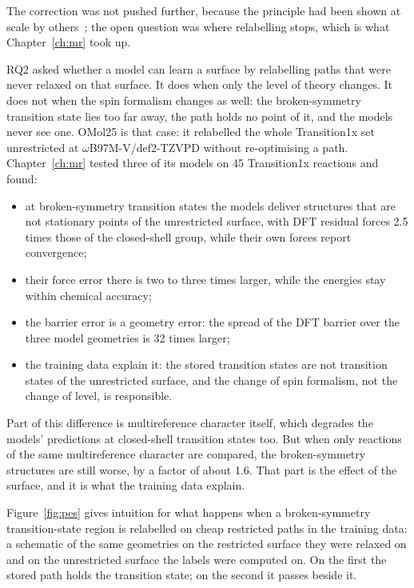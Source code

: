The correction was not pushed further, because the principle had been
shown at scale by others~\cite{allen2026, ren2026}; the open question
was where relabelling stops, which is what Chapter~\ref{ch:mr} took up.

RQ2 asked whether a model can learn a surface by relabelling paths
that were never relaxed on that surface. It does when only the level
of theory changes. It does not when the spin formalism changes as
well: the broken-symmetry transition state lies too far away, the
path holds no point of it, and the models never see one. OMol25 is
that case: it relabelled the whole Transition1x set unrestricted at
\mbox{$\omega$B97M-V/def2-TZVPD} without re-optimising a path.
Chapter~\ref{ch:mr} tested three of its models on 45 Transition1x
reactions and found:

\begin{itemize}
  \item at broken-symmetry transition states the models deliver
    structures that are not stationary points of the unrestricted
    surface, with DFT residual forces 2.5 times those of the
    closed-shell group, while their own forces report convergence;
  \item their force error there is two to three times larger, while
    the energies stay within chemical accuracy;
  \item the barrier error is a geometry error: the spread of the DFT
    barrier over the three model geometries is 32 times larger;
  \item the training data explain it: the stored transition states
    are not transition states of the unrestricted surface, and the
    change of spin formalism, not the change of level, is responsible.
\end{itemize}

Part of this difference is multireference character itself, which
degrades the models' predictions at closed-shell transition states
too. But when only reactions of the same multireference character are
compared, the broken-symmetry structures are still worse, by a factor
of about 1.6. That part is the effect of the surface, and it is what
the training data explain.

Figure~\ref{fig:pes} gives intuition for what happens when a
broken-symmetry transition-state region is relabelled on cheap
restricted paths in the training data: a schematic of the same
geometries on the restricted surface they were relaxed on and on the
unrestricted surface the labels were computed on. On the first the
stored path holds the transition state; on the second it passes
beside it.

